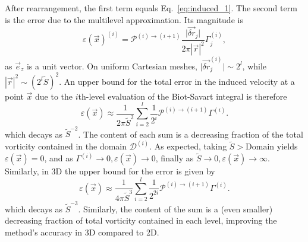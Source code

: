 \documentclass[preprint,12pt]{elsarticle}
\begin{document}
After rearrangement, the first term equals Eq.~\eqref{eq:induced_1}. The second term is the error due to the multilevel approximation. Its magnitude is
\begin{equation}
    \varepsilon(\vec{x})^{(i)} = \mathcal{P}^{(i)\to(i+1)}\frac{\vert\vec{\delta r}_j\vert}{2\pi|\vec{r}|^2}\Gamma^{(i)}_j,
\end{equation}
as $\vec{e}_z$ is a unit vector. On uniform Cartesian meshes, $\vert\vec{\delta r}_j^{(i)}\vert\sim2^{l}$, while $|\vec{r}|^2 \sim (2^l\tilde{S})^2$. An upper bound for the total error in the induced velocity at a point $\vec x$ due to the $i$th-level evaluation of the Biot-Savart integral is therefore
\begin{equation}
    \varepsilon(\vec{x}) \approx \frac{1}{2\pi\tilde{S}^2}\sum_{i=2}^{l}\frac{1}{2^i}\mathcal{P}^{(i)\to(i+1)}
    \Gamma^{(i)}.
\end{equation}
which decays as $\tilde{S}^{-2}$. The content of each sum is a decreasing fraction of the total vorticity contained in the domain $\mathcal{D}^{(i)}$. As expected, taking $\tilde{S}>\text{Domain}$ yields $\varepsilon(\vec{x}) = 0$, and as $\Gamma^{(i)} \to 0, \varepsilon(\vec{x})\to 0$, finally as $\tilde{S}\to0, \varepsilon(\vec{x}) \to \infty$. Similarly, in 3D the upper bound for the error is given by
\begin{equation}
    \varepsilon(\vec{x}) \approx \frac{1}{4\pi\tilde{S}^3}\sum_{i=2}^{l}\frac{1}{2^{2i}}\mathcal{P}^{(i)\to(i+1)}
    \Gamma^{(i)}.
\end{equation}
which decays as $\tilde{S}^{-3}$. Similarly, the content of the sum is a (even smaller) decreasing fraction of total vorticity contained in each level, improving the method's accuracy in 3D compared to 2D.

\end{document}
